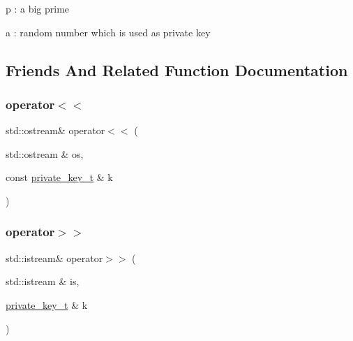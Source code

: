 \begin{DoxyItemize}
\item p \+: a big prime
\item a \+: random number which is used as private key 
\end{DoxyItemize}

\subsection{Friends And Related Function Documentation}
\mbox{\label{structelGamal_1_1private__key__t_afbe5e9a31935a7144b08a2e4648dda18}} 
\subsubsection{\texorpdfstring{operator$<$$<$}{operator<<}}
{\footnotesize\ttfamily std\+::ostream\& operator$<$$<$ (\begin{DoxyParamCaption}\item[{std\+::ostream \&}]{os,  }\item[{const \mbox{\hyperlink{structelGamal_1_1private__key__t}{private\+\_\+key\+\_\+t}} \&}]{k }\end{DoxyParamCaption})\hspace{0.3cm}{\ttfamily [friend]}}

\mbox{\label{structelGamal_1_1private__key__t_a43107ca223fbc64064216565f925e6f3}} 
\subsubsection{\texorpdfstring{operator$>$$>$}{operator>>}}
{\footnotesize\ttfamily std\+::istream\& operator$>$$>$ (\begin{DoxyParamCaption}\item[{std\+::istream \&}]{is,  }\item[{\mbox{\hyperlink{structelGamal_1_1private__key__t}{private\+\_\+key\+\_\+t}} \&}]{k }\end{DoxyParamCaption})\hspace{0.3cm}{\ttfamily [friend]}}




